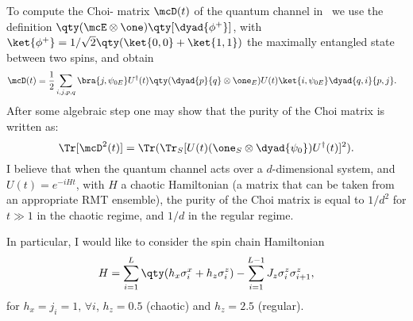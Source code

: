 To compute the Choi-\jami{} matrix $\mcD(t)$ of the quantum channel 
in~ we use the definition 
$\qty(\mcE \otimes \one) \qty[\dyad{\phi^+}]$, with $\ket{\phi^+}=1/\sqrt{2}\qty(\ket{0,0} + \ket{1,1})$
the maximally entangled state between two spins, and obtain
\begin{align}\label{eq:choi:chaometer:2}
\mcD(t) &= 
\frac{1}{2}
\sum_{i,j,p,q}
\bra{j, \psi_{0E}} U^\dagger(t) \qty( \dyad{p}{q}\otimes \one_E ) U(t)
\ket{i, \psi_{0E}} \dyad{q,i}{p,j}.
\end{align}
After some algebraic step one may show that the purity of the Choi matrix is written
as:
\begin{equation}
\Tr[\mcD^2(t)] = 
\Tr( \Tr_S[U(t) (	\one_S \otimes \dyad{\psi_0}) U^\dagger(t)]^2 ).
\end{equation}
I believe that when the quantum channel acts over a $d$-dimensional system, 
and $U(t)=e^{-i H t}$, with $H$ a chaotic Hamiltonian (a matrix that can be taken 
from an appropriate RMT ensemble), the purity of the Choi matrix is equal to 
$1/d^2$ for $t\gg 1$ in the chaotic regime, and $1/d$ in the regular regime.

In particular, I would like to consider the spin chain Hamiltonian 
\begin{equation}\label{eq:H:wisniacki:ising:chain}
H = 
\sum_{i=1}^{L}
\qty(
h_x \sigma_i^x +
h_z \sigma_i^z
) -
\sum_{i=1}^{L-1}
J_z \sigma_{i}^z \sigma_{i+1}^z,
\end{equation}
for $h_x=j_i=1,\, \forall i$, $h_z=0.5$ (chaotic) and $h_z=2.5$ (regular).